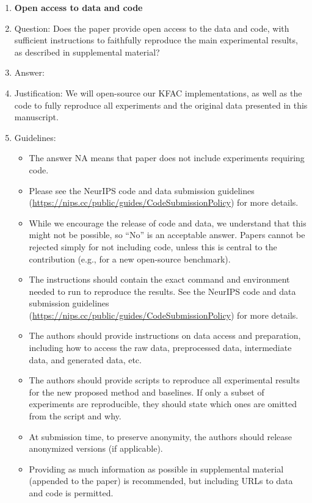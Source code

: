 \begin{enumerate}
\item {\bf Open access to data and code}
\item[] Question: Does the paper provide open access to the data and code, with sufficient instructions to faithfully reproduce the main experimental results, as described in supplemental material?
\item[] Answer: \answerYes{}
\item[] Justification: We will open-source our KFAC implementations, as well as the code to fully reproduce all experiments and the original data presented in this manuscript.
\item[] Guidelines:
  \begin{itemize}
  \item The answer NA means that paper does not include experiments requiring code.
  \item Please see the NeurIPS code and data submission guidelines (\url{https://nips.cc/public/guides/CodeSubmissionPolicy}) for more details.
  \item While we encourage the release of code and data, we understand that this might not be possible, so “No” is an acceptable answer. Papers cannot be rejected simply for not including code, unless this is central to the contribution (e.g., for a new open-source benchmark).
  \item The instructions should contain the exact command and environment needed to run to reproduce the results. See the NeurIPS code and data submission guidelines (\url{https://nips.cc/public/guides/CodeSubmissionPolicy}) for more details.
  \item The authors should provide instructions on data access and preparation, including how to access the raw data, preprocessed data, intermediate data, and generated data, etc.
  \item The authors should provide scripts to reproduce all experimental results for the new proposed method and baselines. If only a subset of experiments are reproducible, they should state which ones are omitted from the script and why.
  \item At submission time, to preserve anonymity, the authors should release anonymized versions (if applicable).
  \item Providing as much information as possible in supplemental material (appended to the paper) is recommended, but including URLs to data and code is permitted.
  \end{itemize}



\end{enumerate}
